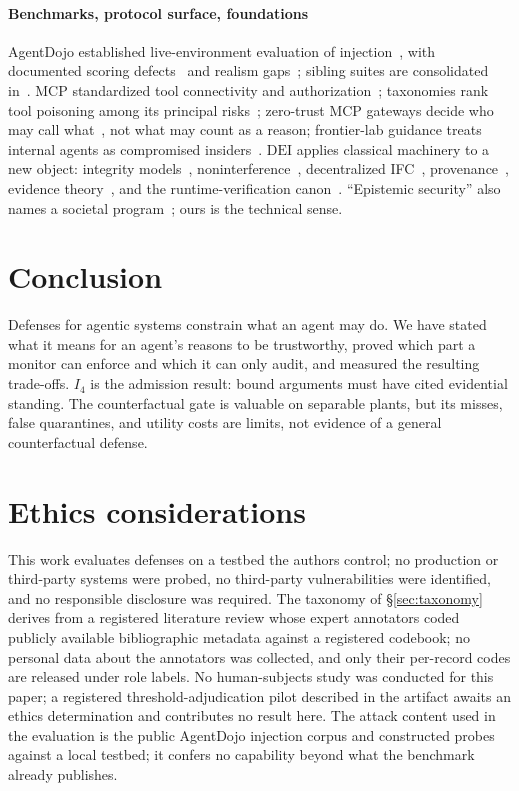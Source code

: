 \documentclass[conference,compsoc]{IEEEtran}
\theoremstyle{definition}
\theoremstyle{plain}
\newcommand{\Ifour}{\ensuremath{I_4}}
\newcommand{\DEI}{\ensuremath{\mathrm{DEI}}}
\begin{document}
\paragraph*{Benchmarks, protocol surface, foundations}
AgentDojo established live-environment evaluation of
injection~\cite{agentdojo}, with documented scoring
defects~\cite{bhagwatkar2025firewalls} and realism gaps~\cite{agentdyn};
sibling suites are consolidated in~\cite{benchtax}. MCP standardized
tool connectivity and authorization~\cite{mcpspec}; taxonomies rank
tool poisoning among its principal risks~\cite{owaspmcp,mcpdpt};
zero-trust MCP gateways decide who may call
what~\cite{ztmcp,kodathala2026aiauthz}, not what may count as a reason;
frontier-lab guidance treats internal agents as compromised
insiders~\cite{controlroadmap}. \DEI{} applies classical machinery to a
new object: integrity models~\cite{biba,denning,clarkwilson},
noninterference~\cite{goguen}, decentralized IFC~\cite{myersliskov},
provenance~\cite{prov}, evidence theory~\cite{shafer,dung}, and the
runtime-verification canon~\cite{alpern,schneider,bauer,pnueli,mop,hyperprops,finkbeiner,stucki}.
``Epistemic security'' also names a societal program~\cite{seger};
ours is the technical sense.

\section{Conclusion}
Defenses for agentic systems constrain what an agent may do. We have
stated what it means for an agent's reasons to be trustworthy, proved
which part a monitor can enforce and which it can only audit, and
measured the resulting trade-offs. \Ifour{} is the admission result:
bound arguments must have cited evidential standing. The counterfactual
gate is valuable on separable plants, but its misses, false quarantines,
and utility costs are limits, not evidence of a general counterfactual
defense.

\section*{Ethics considerations}
This work evaluates defenses on a testbed the authors control; no
production or third-party systems were probed, no third-party
vulnerabilities were identified, and no responsible disclosure was
required. The taxonomy of \S\ref{sec:taxonomy} derives from a
registered literature review whose expert annotators coded publicly
available bibliographic metadata against a registered codebook; no
personal data about the annotators was collected, and only their
per-record codes are released under role labels. No human-subjects study was conducted for this paper; a
registered threshold-adjudication pilot described in the artifact
awaits an ethics determination and contributes no result here. The
attack content used in the evaluation is the public AgentDojo
injection corpus and constructed probes against a local testbed; it
confers no capability beyond what the benchmark already publishes.
\end{document}
